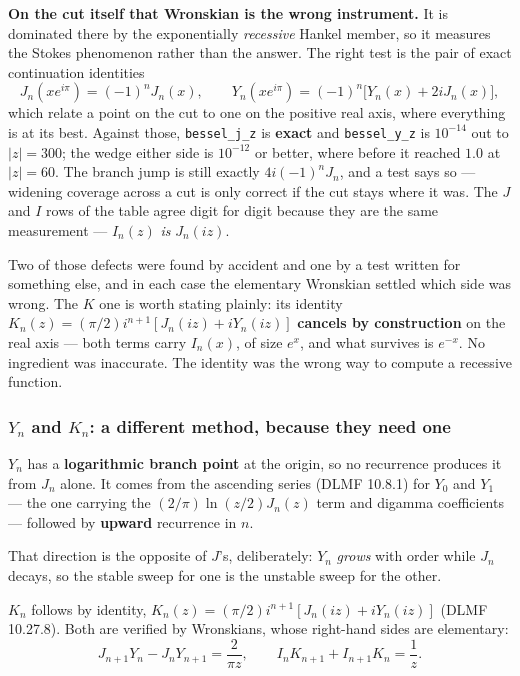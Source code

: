 \documentclass[11pt]{article}
\newcommand{\code}[1]{\texttt{#1}}
\begin{document}
\textbf{On the cut itself that Wronskian is the wrong instrument.} It is
dominated there by the exponentially \emph{recessive} Hankel member, so
it measures the Stokes phenomenon rather than the answer. The right test
is the pair of exact continuation identities
\[
  J_n(xe^{i\pi}) = (-1)^n J_n(x), \qquad
  Y_n(xe^{i\pi}) = (-1)^n\big[Y_n(x) + 2iJ_n(x)\big],
\]
which relate a point on the cut to one on the positive real axis, where
everything is at its best. Against those, \code{bessel\_j\_z} is
\textbf{exact} and \code{bessel\_y\_z} is $10^{-14}$ out to $|z| = 300$;
the wedge either side is $10^{-12}$ or better, where before it reached
$1.0$ at $|z| = 60$. The branch jump is still exactly $4i(-1)^nJ_n$, and
a test says so --- widening coverage across a cut is only correct if the
cut stays where it was. The $J$ and $I$ rows of the table
agree digit for digit because they are the same measurement ---
$I_n(z)$ \emph{is} $J_n(iz)$.

Two of those defects were found by accident and one by a test written
for something else, and in each case the elementary Wronskian settled
which side was wrong. The $K$ one is worth stating plainly: its identity
$K_n(z) = (\pi/2)i^{n+1}[J_n(iz) + iY_n(iz)]$ \textbf{cancels by
construction} on the real axis --- both terms carry $I_n(x)$, of size
$e^{x}$, and what survives is $e^{-x}$. No ingredient was inaccurate.
The identity was the wrong way to compute a recessive function.

\subsubsection*{$Y_n$ and $K_n$: a different method, because they need one}

$Y_n$ has a \textbf{logarithmic branch point} at the origin, so no
recurrence produces it from $J_n$ alone. It comes from the ascending
series (DLMF 10.8.1) for $Y_0$ and $Y_1$ --- the one carrying the
$(2/\pi)\ln(z/2)J_n(z)$ term and digamma coefficients --- followed by
\textbf{upward} recurrence in $n$.

That direction is the opposite of $J$'s, deliberately: $Y_n$ \emph{grows}
with order while $J_n$ decays, so the stable sweep for one is the
unstable sweep for the other.

$K_n$ follows by identity, $K_n(z) = (\pi/2) i^{n+1}[J_n(iz)+iY_n(iz)]$
(DLMF 10.27.8). Both are verified by Wronskians, whose right-hand sides
are elementary:
\[
  J_{n+1}Y_n - J_nY_{n+1} = \frac{2}{\pi z},\qquad
  I_nK_{n+1} + I_{n+1}K_n = \frac{1}{z}.
\]
\end{document}
